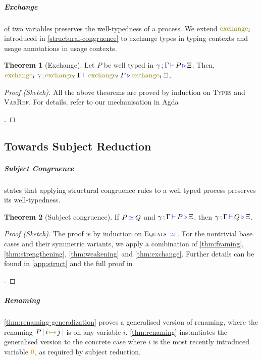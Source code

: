 \documentclass[sigplan,10pt,anonymous,review]{acmart}
\theoremstyle{definition}
\newtheorem{nitheorem}{Theorem}
\newcommand{\type}[1]{\textcolor{blue}{\operatorname{#1}}}
\newcommand{\constr}[1]{\textcolor{orange}{\operatorname{#1}}}
\newcommand{\func}[1]{\textcolor{olive}{\operatorname{#1}}}
\newcommand{\subst}[3]{#1 \, \func{[} \, #3 \, \func{\mapsto} \,#2 \, \func{]}}
\newcommand{\types}[4]{#1 \, \type{;} \, #2 \, \type{\vdash} \, #3 \, \type{\triangleright} \, #4}
\newcommand{\eq}[1]{\, \type{\simeq}_{#1} \,}
\begin{document}
\subparagraph*{Exchange}
of two variables preserves the well-typedness of a process.
We extend $\func{exchange}_i$  introduced in \autoref{structural-congruence} to exchange types in typing contexts and usage annotations in usage contexts.
\begin{nitheorem}[Exchange]
  \label{thm:exchange}
  Let $P$ be well typed in $\types{\gamma}{\Gamma}{P}{\Xi}$.
  Then, $\types{\func{exchange}_i \; \gamma}{\func{exchange}_i \; \Gamma}{\allowbreak \func{exchange}_i \; P}{\func{exchange}_i \; \Xi}$.
\end{nitheorem}

\begin{proof}[Proof (Sketch)]
  All the above theorems are proved by induction on \textsc{Types} and \textsc{VarRef}.
  For details, refer to our mechanisation in Agda%
\begin{anonsuppress}
\cite{Zalakain2020Agda}
\end{anonsuppress}
.
\end{proof}

\subsection{Towards Subject Reduction}
\subparagraph*{Subject Congruence}
states that applying structural congruence rules to a well typed process preserves its well-typedness.

\begin{nitheorem}[Subject congruence]
  \label{thm:subject-congruence}
  If $P \eq{} Q$ and $\types{\gamma}{\Gamma}{P}{\Xi}$, then $\types{\gamma}{\Gamma}{Q}{\Xi}$.
\end{nitheorem}

\begin{proof}[Proof (Sketch)]
  The proof is by induction on \textsc{Equals} $\eq{}$.
  For the nontrivial base cases and their symmetric variants, we apply a combination of \autoref{thm:framing}, \autoref{thm:strengthening}, \autoref{thm:weakening} and \autoref{thm:exchange}.
  Further details can be found in \autoref{app:struct} and the full proof in%
\begin{anonsuppress}
\cite{Zalakain2020Agda}
\end{anonsuppress}
.
\end{proof}

\subparagraph*{Renaming}
\autoref{thm:renaming-generalization} proves a generalised version of renaming, where the renaming $\subst{P}{j}{i}$ is on any variable $i$.
\autoref{thm:renaming} instantiates the generalised version to the concrete case where $i$ is the most recently introduced variable $\constr{0}$, as required by subject reduction.
\end{document}
